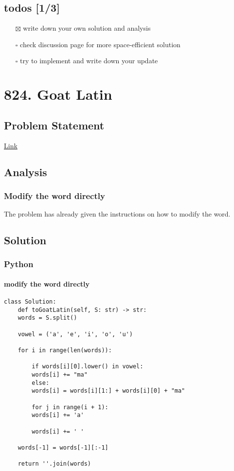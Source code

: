 \documentclass[12pt]{article}
\begin{document}
\subsection{todos [1/3]}
\label{sec:orgc76b319}
\begin{itemize}
\item[{$\boxtimes$}] write down your own solution and analysis
\item[{$\square$}] check discussion page for more space-efficient solution
\item[{$\square$}] try to implement and write down your update
\end{itemize}
\section{824. Goat Latin}
\label{sec:org15b632f}
\subsection{Problem Statement}
\label{sec:orga6deb7f}
\href{https://leetcode.com/problems/goat-latin/}{Link}
\subsection{Analysis}
\label{sec:orgb0ab6b9}
\subsubsection{Modify the word directly}
\label{sec:org2559d02}
The problem has already given the instructions on how to modify the word.
\subsection{Solution}
\label{sec:orgbf486ad}
\subsubsection{Python}
\label{sec:org1fd26ec}
\paragraph{modify the word directly}
\label{sec:org9ae1107}
\begin{verbatim}
class Solution:
    def toGoatLatin(self, S: str) -> str:
	words = S.split()

	vowel = ('a', 'e', 'i', 'o', 'u')

	for i in range(len(words)):

	    if words[i][0].lower() in vowel:
		words[i] += "ma"
	    else:
		words[i] = words[i][1:] + words[i][0] + "ma"

	    for j in range(i + 1):
		words[i] += 'a'

	    words[i] += ' '

	words[-1] = words[-1][:-1]

	return ''.join(words)
\end{verbatim}
\end{document}
